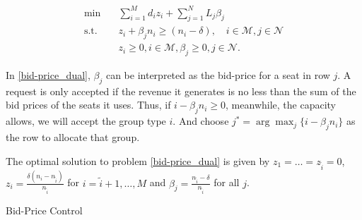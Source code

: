 \begin{equation}\label{bid-price_dual}
    \begin{aligned}
    \min \quad & \sum_{i=1}^{M} d_i z_i + \sum_{j= 1}^{N} L_j \beta_{j} \\
    \text {s.t.} \quad & z_{i} + \beta_j n_i \geq (n_i-\delta), \quad i \in \mathcal{M}, j \in \mathcal{N} \\
    & z_{i} \geq 0, i \in \mathcal{M}, \beta_{j} \geq 0, j \in \mathcal{N}.
    \end{aligned}
  \end{equation}

In \eqref{bid-price_dual}, $\beta_{j}$ can be interpreted as the bid-price for a seat in row $j$. A request is only accepted if the revenue it generates is no less than the sum of the bid prices of the seats it uses. Thus, if $i -\beta_{j} n_i \geq 0$, meanwhile, the capacity allows, we will accept the group type $i$. And choose $j^{*} = \arg \max_{j} \{i -\beta_{j} n_i\}$ as the row to allocate that group.
  
\begin{lem}\label{bid-price}
The optimal solution to problem \eqref{bid-price_dual} is given by $z_1 = \ldots = z_{\tilde{i}} =0$, $z_{i} = \frac{\delta(n_i-n_{\tilde{i}})}{n_{\tilde{i}}}$ for $i = \tilde{i}+1, \ldots, M$ and $\beta_j = \frac{n_{\tilde{i}} - \delta}{n_{\tilde{i}}}$ for all $j$.
\end{lem}


\begin{algorithm}[H]
    \caption{Bid-Price Control}\label{algo_bid}
\end{algorithm}



